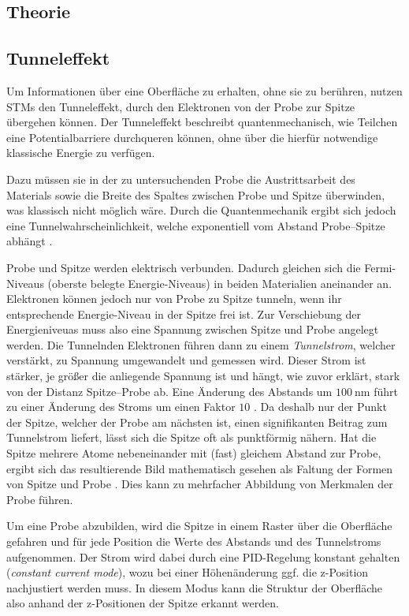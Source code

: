 \documentclass{article}
\begin{document}
\subsection*{Theorie}
\subsection*{Tunneleffekt} 
Um Informationen über eine Oberfläche zu erhalten, ohne sie zu berühren, nutzen STMs den
Tunneleffekt, durch den Elektronen von der Probe zur Spitze übergehen können.
Der Tunneleffekt beschreibt quantenmechanisch, wie Teilchen eine Potentialbarriere durchqueren können, ohne über die hierfür notwendige klassische Energie zu verfügen.

Dazu müssen sie in der zu untersuchenden Probe die Austrittsarbeit des Materials 
sowie  die Breite des Spaltes zwischen Probe und Spitze überwinden,
was klassisch nicht möglich wäre. Durch die Quantenmechanik ergibt sich jedoch eine
Tunnelwahrscheinlichkeit, welche exponentiell vom Abstand Probe--Spitze abhängt \cite{stm-paper}.

Probe und Spitze werden elektrisch verbunden. Dadurch gleichen sich die Fermi-Niveaus (oberste belegte Energie-Niveaus) in beiden Materialien aneinander an.
Elektronen können jedoch nur von Probe zu Spitze tunneln, wenn ihr entsprechende Energie-Niveau
in der Spitze frei ist. Zur Verschiebung der Energieniveuas muss also eine Spannung zwischen Spitze und Probe angelegt werden.
Die Tunnelnden Elektronen führen dann zu einem \textit{Tunnelstrom}, welcher verstärkt,
zu Spannung umgewandelt und gemessen wird. Dieser Strom ist stärker, je größer die
anliegende Spannung ist und hängt,
wie zuvor erklärt, stark von der Distanz Spitze--Probe ab. Eine Änderung des Abstands
um $\SI{100}{\nm}$ führt zu einer Änderung des Stroms um einen Faktor $10$ \cite{naio-video}.
Da deshalb nur der Punkt der Spitze, welcher der Probe am nächsten ist, einen signifikanten Beitrag zum Tunnelstrom liefert,
lässt sich die Spitze oft als punktförmig nähern.
Hat die Spitze mehrere Atome nebeneinander mit (fast) gleichem Abstand zur Probe,
ergibt sich das resultierende Bild mathematisch gesehen als Faltung der Formen
von Spitze und Probe \cite{Anleitung}. Dies kann zu mehrfacher Abbildung von 
Merkmalen der Probe führen.

Um eine Probe abzubilden, wird die Spitze in einem Raster über die Oberfläche 
gefahren und für jede Position die Werte des Abstands und des Tunnelstroms aufgenommen.
Der Strom wird dabei durch eine PID-Regelung konstant gehalten (\textit{constant current mode}), wozu bei einer Höhenänderung ggf. die z-Position nachjustiert werden muss. In diesem Modus kann die Struktur der Oberfläche also anhand der z-Positionen
der Spitze erkannt werden.
\end{document}
